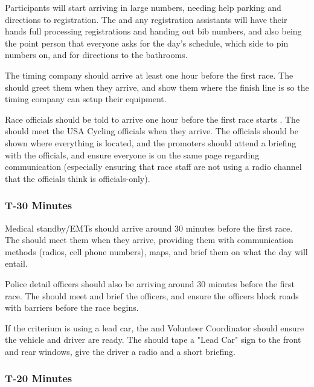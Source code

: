 Participants will start arriving in large numbers, needing help parking and directions to registration.
The  and any registration assistants will have their hands full processing registrations and handing out bib numbers,
and also being the point person that everyone asks for the day's schedule, which side to pin numbers on, and for directions to the bathrooms.

The timing company should arrive at least one hour before the first race.
The  should greet them when they arrive,
and show them where the finish line is so the timing company can setup their equipment.

Race officials should be told to arrive one hour before the first race starts%
.
The  should meet the USA Cycling officials when they arrive.
The officials should be shown where everything is located, and the promoters should attend a briefing with the officials,
and ensure everyone is on the same page regarding communication (especially ensuring that race staff are not using a radio channel that the officials think is officials-only).

\subsubsection{T-30 Minutes}

Medical standby/EMTs should arrive around 30 minutes before the first race.
The  should meet them when they arrive,
providing them with communication methods (radios, cell phone numbers), maps, and brief them on what the day will entail.

Police detail officers should also be arriving around 30 minutes before the first race.
The  should meet and brief the officers, and ensure the officers block roads with barriers
before the race begins.

If the criterium is using a lead car, the  and Volunteer Coordinator should ensure the vehicle and driver are ready.
The  should tape a "Lead Car" sign to the front and rear windows,
give the driver a radio and a short briefing.

\subsubsection{T-20 Minutes}

